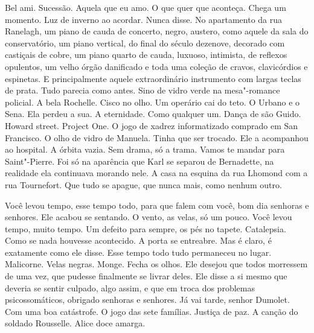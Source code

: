 Bel ami. Sucessão. Aquela que eu amo. O que quer que aconteça. Chega um
momento. Luz de inverno ao acordar. Nunca disse. No apartamento da rua
Ranelagh, um piano de cauda de concerto, negro, austero, como aquele da
sala do conservatório, um piano vertical, do final do século dezenove,
decorado com castiçais de cobre, um piano quarto de cauda, luxuoso,
intimista, de reflexos opulentos, um velho órgão danificado e toda uma
coleção de cravos, clavicórdios e espinetas. E principalmente aquele
extraordinário instrumento com largas teclas de prata. Tudo parecia como
antes. Sino de vidro verde na mesa"-romance policial. A bela Rochelle.
Cisco no olho. Um operário cai do teto. O Urbano e o Sena. Ela perdeu a
sua. A eternidade. Como qualquer um. Dança de são Guido. Howard street.
Project One. O jogo de xadrez informatizado comprado em San Francisco. O
olho de vidro de Manuela. Tinha que ser trocado. Ele a acompanhou ao
hospital. A órbita vazia. Sem drama, só a trama. Vamos te mandar para
Saint"-Pierre. Foi só na aparência que Karl se separou de Bernadette, na
realidade ela continuava morando nele. A casa na esquina da rua Lhomond
com a rua Tournefort. Que tudo se apague, que nunca mais, como nenhum
outro.

Você levou tempo, esse tempo todo, para que falem com você, bom dia
senhoras e senhores. Ele acabou se sentando. O vento, as velas, só um
pouco. Você levou tempo, muito tempo. Um defeito para sempre, os pés no
tapete. Catalepsia. Como se nada houvesse acontecido. A porta se
entreabre. Mas é claro, é exatamente como ele disse. Esse tempo todo
tudo permaneceu no lugar. Malicorne. Velas negras. Monge. Fecha os
olhos. Ele desejou que todos morressem de uma vez, que pudesse
finalmente se livrar deles. Ele disse a si mesmo que deveria se sentir
culpado, algo assim, e que em troca dos problemas psicossomáticos,
obrigado senhoras e senhores. Já vai tarde, senhor Dumolet. Com uma boa
catástrofe. O jogo das sete famílias. Justiça de paz. A canção do
soldado Rousselle. Alice doce amarga.

\pagebreak

\pagestyle{empty}

